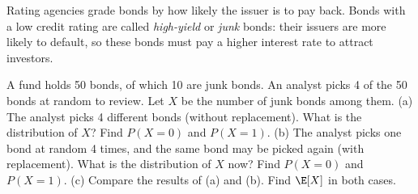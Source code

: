 
\begin{problem}
	\begin{context}
		Rating agencies grade bonds by how likely the issuer is to pay back.
		Bonds with a low credit rating are called \emph{high-yield} or
		\emph{junk} bonds: their issuers are more likely to default, so these
		bonds must pay a higher interest rate to attract investors.
	\end{context}
	A fund holds 50 bonds, of which 10 are junk bonds. An analyst picks 4 of
	the 50 bonds at random to review. Let $X$ be the number of junk bonds
	among them.
	(a) The analyst picks 4 different bonds (without replacement). What is the
	distribution of $X$? Find $P(X=0)$ and $P(X=1)$.
	(b) The analyst picks one bond at random 4 times, and the same bond may be
	picked again (with replacement). What is the distribution of $X$ now? Find
	$P(X=0)$ and $P(X=1)$.
	(c) Compare the results of (a) and (b). Find $\E[X]$ in both cases.
\end{problem}

